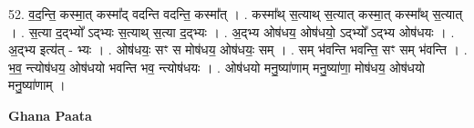 \documentclass[17pt]{extarticle}
\begin{document}
52. व॒द॒न्ति॒ कस्मा॒त् कस्मा᳚द् वदन्ति वदन्ति॒ कस्मा᳚त् । . कस्मा᳚थ् स॒त्याथ् स॒त्यात् कस्मा॒त् कस्मा᳚थ् स॒त्यात् । . स॒त्या द॒द्भ्यो᳚ ऽद्भ्यः स॒त्याथ् स॒त्या द॒द्भ्यः । . अ॒द्भ्य ओष॑धय॒ ओष॑धयो॒ ऽद्भ्यो᳚ ऽद्भ्य ओष॑धयः । . अ॒द्भ्य इत्य॑त् - भ्यः । . ओष॑धयः॒ सꣳ स मोष॑धय॒ ओष॑धयः॒ सम् । . सम् भ॑वन्ति भवन्ति॒ सꣳ सम् भ॑वन्ति । . भ॒व॒ न्त्योष॑धय॒ ओष॑धयो भवन्ति भव॒ न्त्योष॑धयः । . ओष॑धयो मनु॒ष्या॑णाम् मनु॒ष्या॑णा॒ मोष॑धय॒ ओष॑धयो मनु॒ष्या॑णाम् । \newline

\textbf{Ghana Paata } \newline
\end{document}
